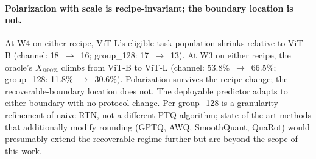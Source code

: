 \documentclass{article}
\makeatletter
\newcommand{\xat}[1]{\ensuremath{X_{@#1\%}}}
\makeatother
\begin{document}
\paragraph{Polarization with scale is recipe-invariant; the boundary location is not.}
At W4 on either recipe, ViT-L's eligible-task population shrinks relative to ViT-B (channel: 18~$\to$~16; group\_128: 17~$\to$~13). At W3 on either recipe, the oracle's \xat{90} climbs from ViT-B to ViT-L (channel: 53.8\%~$\to$~66.5\%; group\_128: 11.8\%~$\to$~30.6\%). Polarization survives the recipe change; the recoverable-boundary location does not. The deployable predictor adapts to either boundary with no protocol change. Per-group\_128 is a granularity refinement of naive RTN, not a different PTQ algorithm; state-of-the-art methods that additionally modify rounding (GPTQ, AWQ, SmoothQuant, QuaRot) would presumably extend the recoverable regime further but are beyond the scope of this work.
\end{document}
